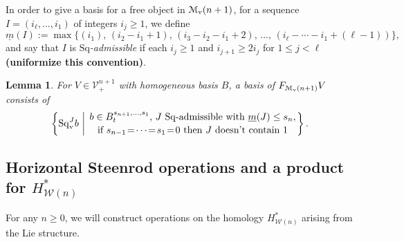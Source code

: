 \documentclass[11pt]{amsart}
\theoremstyle{plain}
\newtheorem{lem}[thm]{Lemma}
\theoremstyle{definition}
\newcommand{\calV}{\mathcal{V}}
\newcommand{\calw}{\mathcal{W}}
\newcommand{\calMv}{\mathcal{M}_\textup{v}}
\theoremstyle{plain}
\newcommand{\vect}[2]{\calV^{#1}_{#2}}
\newcommand{\minDimSq}{\underline{m}}
\newcommand{\Sq}{\mathrm{Sq}}
\begin{document}
\begin{Cohomology Operations for W and U}
In order to give a basis for a free object in $\calMv(n+1)$, for a sequence $I=(i_\ell,\ldots,i_1)$ of integers $i_j\geq1$, we define
\[\minDimSq(I):=\max\{(i_1),\,(i_2-i_1+1),\,(i_3-i_2-i_1+2),\,\ldots,\,(i_{\ell}-\cdots-i_1+(\ell-1))\},
\]
and say that $I$ is \emph{$\Sq$-admissible} if each $i_j\geq1$ and $i_{j+1}\geq 2i_j$ for $1\leq j <\ell$ \textbf{(uniformize this convention)}.
\begin{lem}
For $V\in\vect{n+1}{+}$ with homogeneous basis $B$, a basis of $F_{\calMv(n+1)}V$ consists of
\[\left\{\Sq^J_{\textup{v}}b\ \middle|\ \genfrac{}{}{0pt}{}{b\in B^{s_{n+1},\ldots,s_1}_t\textup{, $J$ $\Sq$-admissible with }\minDimSq(J)\leq s_n,}{\textup{if }s_{n-1}\!=\!\cdots\!=\!s_1\!=\!0\textup{ then $J$ doesn't contain 1}}\right\}.\]


\end{lem}

\subsection{Horizontal Steenrod operations and a product for $H^*_{\calw(n)}$}\label{Horizontal Steenrod operations and a product for HWn}
For any $n\geq 0$, we will construct operations on the homology $H^*_{\calw(n)}$ arising from the Lie structure.


\end{Cohomology Operations for W and U}
\end{document}

